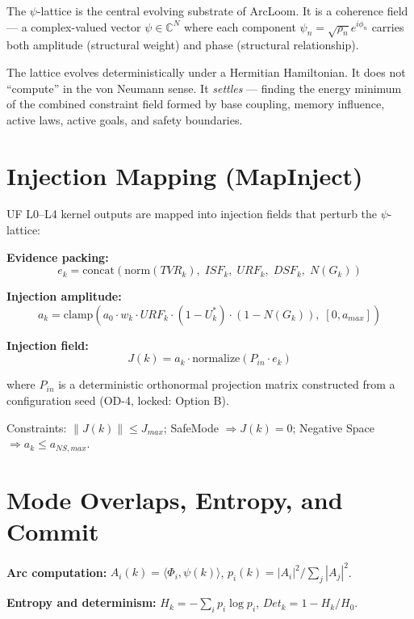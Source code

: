 \documentclass[11pt, a4paper]{report}
\begin{document}
The $\psi$-lattice is the central evolving substrate of ArcLoom. It is a
coherence field --- a complex-valued vector $\psi \in \mathbb{C}^N$ where
each component $\psi_n = \sqrt{\rho_n} e^{i\phi_n}$ carries both amplitude
(structural weight) and phase (structural relationship).

The lattice evolves deterministically under a Hermitian Hamiltonian. It
does not ``compute'' in the von Neumann sense. It \textit{settles} ---
finding the energy minimum of the combined constraint field formed by
base coupling, memory influence, active laws, active goals, and safety
boundaries.

\section{Injection Mapping (MapInject)}

UF L0--L4 kernel outputs are mapped into injection fields that perturb
the $\psi$-lattice:

\textbf{Evidence packing:}
\begin{equation}
  e_k = \text{concat}\!\left( \text{norm}(TVR_k),\; ISF_k,\; URF_k,\; DSF_k,\; N(G_k) \right)
\end{equation}

\textbf{Injection amplitude:}
\begin{equation}
  a_k = \text{clamp}\!\left( a_0 \cdot w_k \cdot URF_k \cdot (1-U^*_k) \cdot (1-N(G_k)),\; [0, a_{max}] \right)
\end{equation}

\textbf{Injection field:}
\begin{equation}
  J(k) = a_k \cdot \text{normalize}(P_{in} \cdot e_k)
\end{equation}

where $P_{in}$ is a deterministic orthonormal projection matrix constructed
from a configuration seed (OD-4, locked: Option B).

Constraints: $\|J(k)\| \leq J_{max}$; SafeMode $\Rightarrow J(k) = 0$;
Negative Space $\Rightarrow a_k \leq a_{NS,max}$.

\section{Mode Overlaps, Entropy, and Commit}

\textbf{Arc computation:}
$A_i(k) = \langle \Phi_i, \psi(k) \rangle$, \quad
$p_i(k) = |A_i|^2 / \sum_j |A_j|^2$.

\textbf{Entropy and determinism:}
$H_k = -\sum_i p_i \log p_i$, \quad
$Det_k = 1 - H_k / H_0$.
\end{document}
